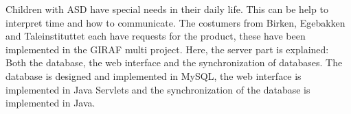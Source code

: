 Children with ASD have special needs in their daily life. This can be help to interpret time and how to communicate.
The costumers from Birken, Egebakken and Taleinstituttet each have requests for the product, these have been implemented in the GIRAF multi project. Here, the server part is explained: Both the database, the web interface and the synchronization of databases. The database is designed and implemented in MySQL, the web interface is implemented in Java Servlets and the synchronization of the database is implemented in Java.